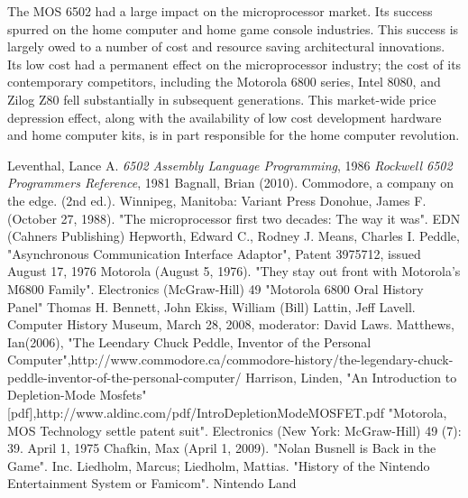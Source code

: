 \documentclass[journal]{IEEEtran}
\begin{document}
The MOS 6502 had a large impact on the microprocessor market. Its success
spurred on the home computer and home game console industries. This success is
largely owed to a number of cost and resource saving architectural innovations.
Its low cost had a permanent effect on the microprocessor industry; the cost of
its contemporary competitors, including the Motorola 6800 series, Intel 8080,
and Zilog Z80 fell substantially in subsequent generations. This market-wide
price depression effect, along with the availability of low cost development
hardware and home computer kits, is in part responsible for the home computer
revolution.

\begin{thebibliography}{1}

Leventhal, Lance A. \emph{6502 Assembly Language Programming}, 1986
\emph{Rockwell 6502 Programmers Reference}, 1981
Bagnall, Brian (2010). Commodore, a company on the edge. (2nd ed.). Winnipeg, Manitoba: Variant Press
Donohue, James F. (October 27, 1988). "The microprocessor first two decades: The way it was". EDN (Cahners Publishing) 
Hepworth, Edward C., Rodney J. Means, Charles I. Peddle, "Asynchronous Communication Interface Adaptor", Patent 3975712, issued August 17, 1976
Motorola (August 5, 1976). "They stay out front with Motorola's M6800 Family". Electronics (McGraw-Hill) 49
"Motorola 6800 Oral History Panel" Thomas H. Bennett, John Ekiss, William (Bill) Lattin, Jeff Lavell. Computer History Museum, March 28, 2008, moderator: David Laws.
Matthews, Ian(2006), "The Leendary Chuck Peddle, Inventor of the Personal Computer",http://www.commodore.ca/commodore-history/the-legendary-chuck-peddle-inventor-of-the-personal-computer/
Harrison, Linden, "An Introduction to Depletion-Mode Mosfets"[pdf],http://www.aldinc.com/pdf/IntroDepletionModeMOSFET.pdf
"Motorola, MOS Technology settle patent suit". Electronics (New York: McGraw-Hill) 49 (7): 39. April 1, 1975
Chafkin, Max (April 1, 2009). "Nolan Busnell is Back in the Game". Inc.
Liedholm, Marcus; Liedholm, Mattias. "History of the Nintendo Entertainment System or Famicom". Nintendo Land

\end{thebibliography}
\end{document}
